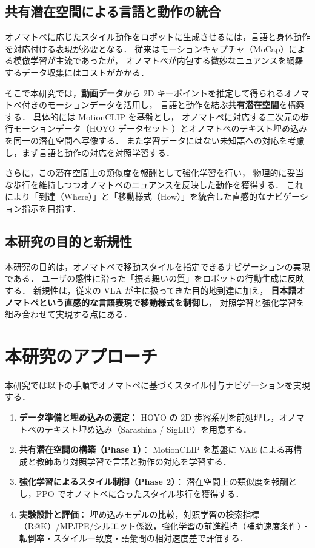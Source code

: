 \subsection{共有潜在空間による言語と動作の統合}
オノマトペに応じたスタイル動作をロボットに生成させるには，言語と身体動作を対応付ける表現が必要となる．
従来はモーションキャプチャ（MoCap）による模倣学習が主流であったが，
オノマトペが内包する微妙なニュアンスを網羅するデータ収集にはコストがかかる．

そこで本研究では，\textbf{動画データ}から 2D キーポイントを推定して得られるオノマトペ付きのモーションデータを活用し，
言語と動作を結ぶ\textbf{共有潜在空間}を構築する．
具体的には MotionCLIP \cite{MotionCLIP} を基盤とし，
オノマトペに対応する二次元の歩行モーションデータ（HOYO データセット \cite{hoyo}）とオノマトペのテキスト埋め込みを同一の潜在空間へ写像する．
また学習データにはない未知語への対応を考慮し，まず言語と動作の対応を対照学習する．

さらに，この潜在空間上の類似度を報酬として強化学習を行い，
物理的に妥当な歩行を維持しつつオノマトペのニュアンスを反映した動作を獲得する．
これにより「到達（Where）」と「移動様式（How）」を統合した直感的なナビゲーション指示を目指す．

\subsection{本研究の目的と新規性}
本研究の目的は，オノマトペで移動スタイルを指定できるナビゲーションの実現である．
ユーザの感性に沿った「振る舞いの質」をロボットの行動生成に反映する．
新規性は，従来の VLA が主に扱ってきた目的地到達に加え，
\textbf{日本語オノマトペという直感的な言語表現で移動様式を制御し}，
対照学習と強化学習を組み合わせて実現する点にある．

\section{本研究のアプローチ}
\label{sec:approach}

本研究では以下の手順でオノマトペに基づくスタイル付与ナビゲーションを実現する．
\begin{enumerate}
  \item \textbf{データ準備と埋め込みの選定}：
        HOYO の 2D 歩容系列を前処理し，オノマトペのテキスト埋め込み（Sarashina / SigLIP）を用意する．
  \item \textbf{共有潜在空間の構築（Phase 1）}：
        MotionCLIP を基盤に VAE による再構成と教師あり対照学習で言語と動作の対応を学習する．
  \item \textbf{強化学習によるスタイル制御（Phase 2）}：
        潜在空間上の類似度を報酬とし，PPO でオノマトペに合ったスタイル歩行を獲得する．
  \item \textbf{実験設計と評価}：
        埋め込みモデルの比較，対照学習の検索指標（R@K）/MPJPE/シルエット係数，強化学習の前進維持（補助速度条件）・転倒率・スタイル一致度・語彙間の相対速度差で評価する．
\end{enumerate}

